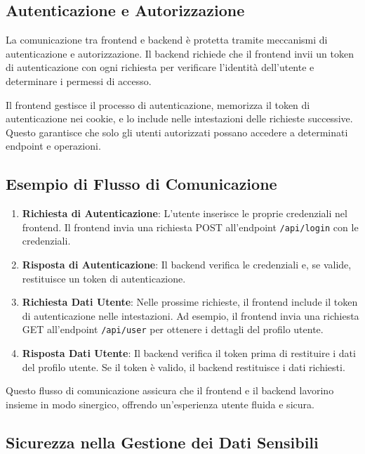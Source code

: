 \documentclass[twoside]{supsistudent}
\begin{document}
\subsection{Autenticazione e Autorizzazione}

La comunicazione tra frontend e backend è protetta tramite meccanismi di autenticazione e autorizzazione. Il backend richiede che il frontend invii un token di autenticazione con ogni richiesta per verificare l'identità dell'utente e determinare i permessi di accesso.

Il frontend gestisce il processo di autenticazione, memorizza il token di autenticazione nei cookie, e lo include nelle intestazioni delle richieste successive. Questo garantisce che solo gli utenti autorizzati possano accedere a determinati endpoint e operazioni.

\subsection{Esempio di Flusso di Comunicazione}

\begin{enumerate}
  \item \textbf{Richiesta di Autenticazione}: L'utente inserisce le proprie credenziali nel frontend. Il frontend invia una richiesta POST all'endpoint \texttt{/api/login} con le credenziali.
  \item \textbf{Risposta di Autenticazione}: Il backend verifica le credenziali e, se valide, restituisce un token di autenticazione.
  \item \textbf{Richiesta Dati Utente}: Nelle prossime richieste, il frontend include il token di autenticazione nelle intestazioni. Ad esempio, il frontend invia una richiesta GET all'endpoint \texttt{/api/user} per ottenere i dettagli del profilo utente.
  \item \textbf{Risposta Dati Utente}: Il backend verifica il token prima di restituire i dati del profilo utente. Se il token è valido, il backend restituisce i dati richiesti.
\end{enumerate}

Questo flusso di comunicazione assicura che il frontend e il backend lavorino insieme in modo sinergico, offrendo un'esperienza utente fluida e sicura.

\subsection{Sicurezza nella Gestione dei Dati Sensibili}
\end{document}

